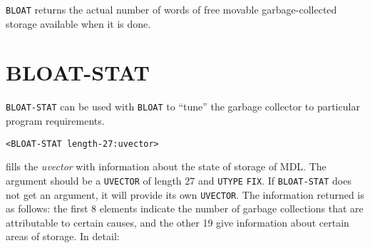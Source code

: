 \documentclass[a4paper]{scrbook}
\begin{document}
\texttt{BLOAT} returns the actual number of words of free movable garbage-collected storage available when it is done.

\section{BLOAT-STAT}\label{bloat-stat}

\texttt{BLOAT-STAT} can be used with \texttt{BLOAT} to ``tune'' the garbage collector to
particular program requirements.

\begin{verbatim}
<BLOAT-STAT length-27:uvector>
\end{verbatim}

fills the \emph{uvector} with information about the state of storage of MDL. The argument should be a \texttt{UVECTOR} of
length 27 and \texttt{UTYPE} \texttt{FIX}. If \texttt{BLOAT-STAT} does not get an argument, it will provide its own
\texttt{UVECTOR}. The information returned is as follows: the first 8 elements indicate the number of garbage collections
that are attributable to certain causes, and the other 19 give information about certain areas of storage. In detail:
\end{document}
